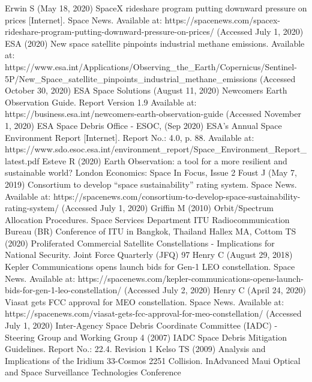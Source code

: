 \documentclass[12pt,a4paper,notitlepage,twoside,openright]{report}
\begin{document}
\begin{thebibliography}{100}
 Erwin S (May 18, 2020) SpaceX rideshare program putting downward pressure on prices [Internet]. Space News. Available at: https://spacenews.com/spacex-rideshare-program-putting-downward-pressure-on-prices/ (Accessed July 1, 2020)
 ESA (2020) New space satellite pinpoints industrial methane emissions. Available at: https://www.esa.int/Applications/Observing_the_Earth/Copernicus/Sentinel-5P/New_Space_satellite_pinpoints_industrial_methane_emissions (Accessed October 30, 2020)
 ESA Space Solutions (August 11, 2020) Newcomers Earth Observation Guide. Report Version 1.9 Available at: https://business.esa.int/newcomers-earth-observation-guide (Accessed November 1, 2020)
 ESA Space Debris Office - ESOC, (Sep 2020) ESA’s Annual Space Environment Report [Internet]. Report No.: 4.0, p. 88. Available at: https://www.sdo.esoc.esa.int/environment_report/Space_Environment_Report_latest.pdf
 Esteve R (2020) Earth Observation: a tool for a more resilient and sustainable world? London Economics: Space In Focus, Issue 2
 Foust J (May 7, 2019) Consortium to develop “space sustainability” rating system. Space News. Available at: https://spacenews.com/consortium-to-develop-space-sustainability-rating-system/ (Accessed July 1, 2020)
 Griffin M (2010) Orbit/Spectrum Allocation Procedures. Space Services Department ITU Radiocommunication Bureau (BR) Conference of ITU in Bangkok, Thailand
 Hallex MA, Cottom TS (2020) Proliferated Commercial Satellite Constellations - Implications for National Security. Joint Force Quarterly (JFQ) 97
 Henry C (August 29, 2018) Kepler Communications opens launch bids for Gen-1 LEO constellation. Space News. Available at: https://spacenews.com/kepler-communications-opens-launch-bids-for-gen-1-leo-constellation/ (Accessed July 2, 2020)
 Henry C (April 24, 2020) Viasat gets FCC approval for MEO constellation. Space News. Available at: https://spacenews.com/viasat-gets-fcc-approval-for-meo-constellation/ (Accessed July 1, 2020)
 Inter-Agency Space Debris Coordinate Committee (IADC) -  Steering Group and Working Group 4 (2007) IADC Space Debris Mitigation Guidelines. Report No.: 22.4. Revision 1
 Kelso TS (2009) Analysis and Implications of the Iridium 33-Cosmos 2251 Collision. InAdvanced Maui Optical and Space Surveillance Technologies Conference

\end{thebibliography}
\end{document}
